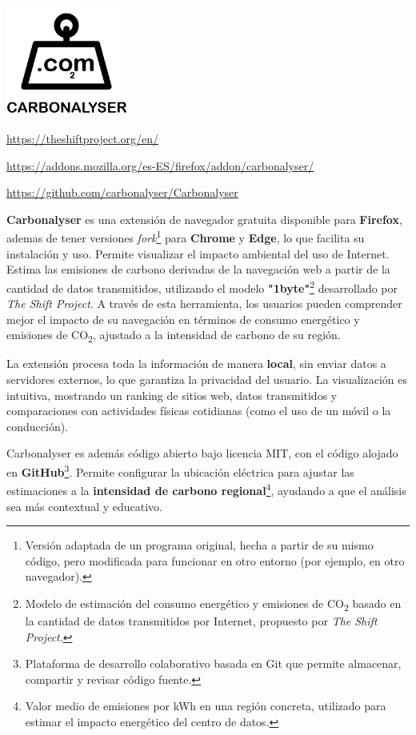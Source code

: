 \documentclass[12pt,a4paper]{report}
\begin{document}
\begin{center}
\includegraphics[width=0.3\textwidth]{imagenes/Carbonalyser_Logo.png}
\end{center}

\href{https://theshiftproject.org/en/}{https://theshiftproject.org/en/}

\href{https://addons.mozilla.org/es-ES/firefox/addon/carbonalyser/}{https://addons.mozilla.org/es-ES/firefox/addon/carbonalyser/}

\href{https://github.com/carbonalyser/Carbonalyser}{https://github.com/carbonalyser/Carbonalyser}

\textbf{Carbonalyser} es una extensión de navegador gratuita disponible para \textbf{Firefox}, ademas de tener versiones \textit{fork}\footnote{Versión adaptada de un programa original, hecha a partir de su mismo código, pero modificada para funcionar en otro entorno (por ejemplo, en otro navegador).} para
\textbf{Chrome} y \textbf{Edge}, lo que facilita su instalación y uso. Permite visualizar el impacto ambiental del uso de Internet. Estima las emisiones de carbono derivadas de la navegación web a partir de la cantidad de datos transmitidos, utilizando el modelo \textbf{"1byte"}\footnote{Modelo de estimación del consumo energético y emisiones de CO\textsubscript{2} basado en la cantidad de datos transmitidos por Internet, propuesto por \textit{The Shift Project}.} desarrollado por \textit{The Shift Project}. A través de esta herramienta, los usuarios pueden comprender mejor el impacto de su navegación en términos de consumo energético y emisiones de CO\textsubscript{2}, ajustado a la intensidad de carbono de su región.

La extensión procesa toda la información de manera \textbf{local}, sin enviar
datos a servidores externos, lo que garantiza la privacidad del usuario. La
visualización es intuitiva, mostrando un ranking de sitios web, datos
transmitidos y comparaciones con actividades físicas cotidianas (como el uso de
un móvil o la conducción).

Carbonalyser es además código abierto bajo licencia MIT, con el código alojado
en \textbf{GitHub}\footnote{Plataforma de desarrollo colaborativo basada en Git que permite almacenar, compartir y revisar
  código fuente.}. Permite configurar la ubicación eléctrica para ajustar las
estimaciones a la \textbf{intensidad de carbono regional}\footnote{Valor medio de emisiones por kWh en una región concreta, utilizado para estimar el impacto energético del centro de datos.}, ayudando a que el análisis
sea más contextual y educativo.
\end{document}
